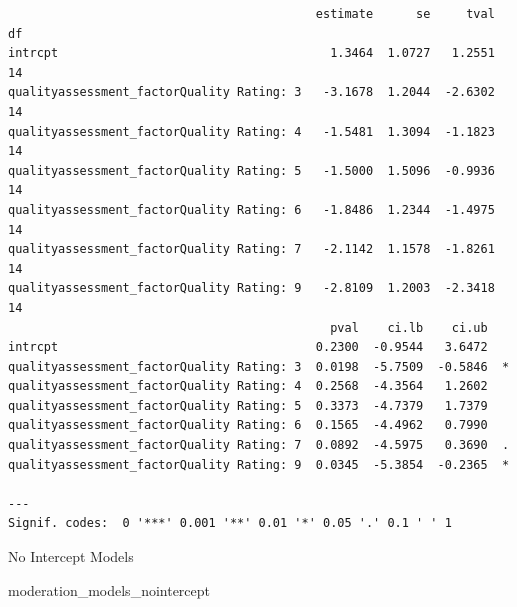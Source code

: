 \documentclass[
  letterpaper,
  DIV=11,
  numbers=noendperiod]{scrartcl}
\newenvironment{Shaded}{\begin{snugshade}}{\end{snugshade}}
\newcommand{\NormalTok}[1]{\textcolor[rgb]{0.00,0.23,0.31}{#1}}
\begin{document}
\begin{verbatim}
                                           estimate      se     tval  df 
intrcpt                                      1.3464  1.0727   1.2551  14 
qualityassessment_factorQuality Rating: 3   -3.1678  1.2044  -2.6302  14 
qualityassessment_factorQuality Rating: 4   -1.5481  1.3094  -1.1823  14 
qualityassessment_factorQuality Rating: 5   -1.5000  1.5096  -0.9936  14 
qualityassessment_factorQuality Rating: 6   -1.8486  1.2344  -1.4975  14 
qualityassessment_factorQuality Rating: 7   -2.1142  1.1578  -1.8261  14 
qualityassessment_factorQuality Rating: 9   -2.8109  1.2003  -2.3418  14 
                                             pval    ci.lb    ci.ub    
intrcpt                                    0.2300  -0.9544   3.6472    
qualityassessment_factorQuality Rating: 3  0.0198  -5.7509  -0.5846  * 
qualityassessment_factorQuality Rating: 4  0.2568  -4.3564   1.2602    
qualityassessment_factorQuality Rating: 5  0.3373  -4.7379   1.7379    
qualityassessment_factorQuality Rating: 6  0.1565  -4.4962   0.7990    
qualityassessment_factorQuality Rating: 7  0.0892  -4.5975   0.3690  . 
qualityassessment_factorQuality Rating: 9  0.0345  -5.3854  -0.2365  * 

---
Signif. codes:  0 '***' 0.001 '**' 0.01 '*' 0.05 '.' 0.1 ' ' 1
\end{verbatim}

No Intercept Models

\begin{Shaded}
\begin{Highlighting}[]
\NormalTok{moderation\_models\_nointercept}
\end{Highlighting}
\end{Shaded}
\end{document}
